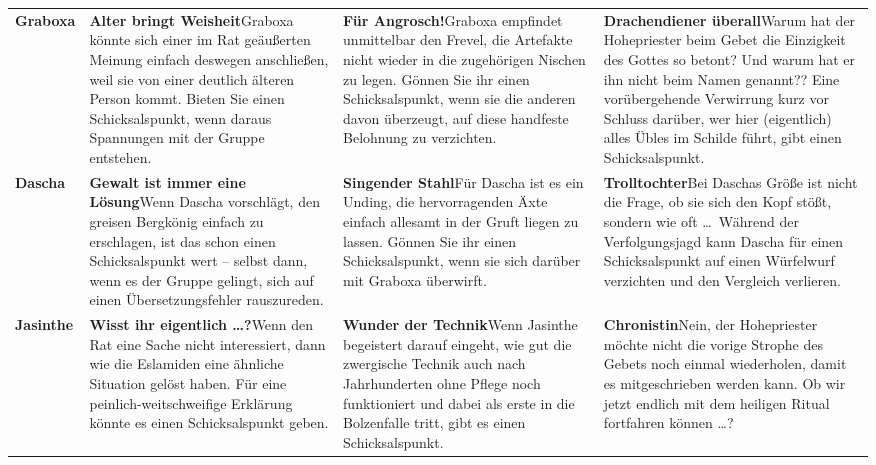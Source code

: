 \begin{tabularx}{0.98\linewidth}{l|XXX}
	&\tkopf{Der Tiefe Rat} & \tkopf{Die Finsterkopp-Binge}&\tkopf{Das Szepter}\\
	\hline
	
	\textbf{Graboxa}&\textbf{Alter bringt Weisheit}\newline Graboxa könnte sich einer im Rat geäußerten Meinung einfach deswegen anschließen, weil sie von einer deutlich älteren Person kommt. Bieten Sie einen Schicksalspunkt, wenn daraus Spannungen mit der Gruppe entstehen.
	&\textbf{Für Angrosch!}\newline Graboxa empfindet unmittelbar den Frevel, die Artefakte nicht wieder in die zugehörigen Nischen zu legen. Gönnen Sie ihr einen Schicksalspunkt, wenn sie die anderen davon überzeugt, auf diese handfeste Belohnung zu verzichten.
	& \textbf{Drachendiener überall}\newline Warum hat der Hohepriester beim Gebet die Einzigkeit des Gottes so betont? Und warum hat er ihn nicht beim Namen genannt?? Eine vorübergehende Verwirrung kurz vor Schluss darüber, wer hier (eigentlich) alles Übles im Schilde führt, gibt einen Schicksalspunkt.\\
	
	\textbf{Dascha}&\textbf{Gewalt ist immer eine Lösung}\newline Wenn Dascha vorschlägt, den greisen Bergkönig einfach zu erschlagen, ist das schon einen Schicksalspunkt wert -- selbst dann, wenn es der Gruppe gelingt, sich auf einen Übersetzungsfehler rauszureden. &\textbf{Singender Stahl}\newline Für Dascha ist es ein Unding, die hervorragenden Äxte einfach allesamt in der Gruft liegen zu lassen. Gönnen Sie ihr einen Schicksalspunkt, wenn sie sich darüber mit Graboxa überwirft.&\textbf{Trolltochter}\linebreak Bei Daschas Größe ist nicht die Frage, ob sie sich den Kopf stößt, sondern wie oft \dots\ Während der Verfolgungsjagd kann Dascha für einen Schicksalspunkt auf einen Würfelwurf verzichten und den Vergleich verlieren.\\
	
	\textbf{Jasinthe}&\textbf{Wisst ihr eigentlich \dots ?}\newline Wenn den Rat eine Sache nicht interessiert, dann wie die Eslamiden eine ähnliche Situation gelöst haben. Für eine peinlich-weitschweifige Erklärung könnte es einen Schicksalspunkt geben.&\textbf{Wunder der Technik}\newline Wenn Jasinthe begeistert darauf eingeht, wie gut die zwergische Technik auch nach Jahrhunderten ohne Pflege noch funktioniert und dabei als erste in die Bolzenfalle tritt, gibt es einen Schicksalspunkt.&\textbf{Chronistin}\newline Nein, der Hohepriester möchte nicht die vorige Strophe des Gebets noch einmal wiederholen, damit es mitgeschrieben werden kann. Ob wir jetzt endlich mit dem heiligen Ritual fortfahren können \dots?\\
	

\end{tabularx}
